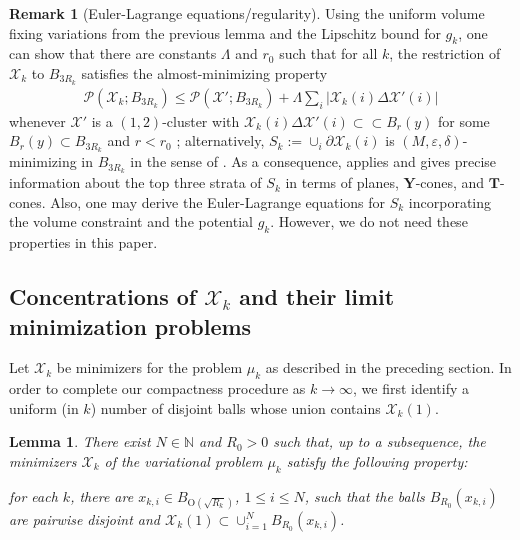 \documentclass[10pt,reqno]{amsart}
\numberwithin{equation}{section}
\newtheorem{lemma}[theorem]{Lemma}
\theoremstyle{definition}
\newtheorem{remark}[theorem]{Remark}
\newcommand{\cc}{\subset\!\subset}
\newcommand{\Orm}{\mathrm{O}}
\newcommand{\Pcal}{\mathcal{P}}
\newcommand{\e}{\varepsilon}
\newcommand{\X}{\mathcal{X}}
\begin{document}
{\begin{remark}[Euler-Lagrange equations/regularity]\label{rmk: regularity}
 Using the uniform volume fixing variations from the previous lemma and the Lipschitz bound for $g_k$, one can show that there are constants $\Lambda$ and $r_0$ such that for all $k$, the restriction of $\X_k$ to $B_{3R_k}$ satisfies the almost-minimizing property
    \begin{align}\label{eq:lambda min cluster}
     \Pcal (\X_k; B_{3R_k})\leq \Pcal(\X';B_{3R_k}) + \Lambda\sum_{i}|\X_k(i) \Delta \X'(i)|
    \end{align}
    whenever $\X'$ is a $(1,2)$-cluster with $\X_k(i) \Delta \X'(i)\cc B_r(y)$ for some $B_r(y)\subset B_{3R_k}$ and $r<r_0$ \cite[Equation 1.1]{MagLeo17}; alternatively, $S_k:=\cup_i \partial \X_k(i)$ is $(M,\e,\delta)$-minimizing in $B_{3R_k}$ in the sense of \cites{Alm76,JTaylor76}. As a consequence, \cite[Theorem 3.10]{ColEdeSpo22} applies and gives precise information about the top three strata of $S_k$ in terms of planes, $\mathbf{Y}$-cones, and $\mathbf{T}$-cones. Also, one may derive the Euler-Lagrange equations for $S_k$ incorporating the volume constraint and the potential $g_k$. However, we do not need these properties in this paper.
\end{remark}


\subsection{Concentrations of $\X_k$ and their limit minimization problems}\label{ss:conc}
Let $\X_k$ be minimizers for the problem $\mu_k$ as described in the preceding section. In order to complete our compactness procedure as $k\to \infty$, we first identify a uniform (in $k$) number of disjoint balls whose union contains $\X_k(1)$.

\begin{lemma}\label{lemma:identifying concentrations}
There exist $N\in \mathbb{N}$ and $R_0>0$ such that, up to a subsequence, the minimizers $\X_k$ of the variational problem $\mu_k$ satisfy the following property:

\smallskip

for each $k$, there are $x_{k,i}\in B_{{\Orm(\sqrt{R_k})}}$, $1\leq i \leq N$, such that the balls $B_{R_0}(x_{k,i})$ are pairwise disjoint and 
$\X_k(1) \subset \cup_{i=1}^N B_{R_0}(x_{k,i})$.
\end{lemma}

}
\end{document}
